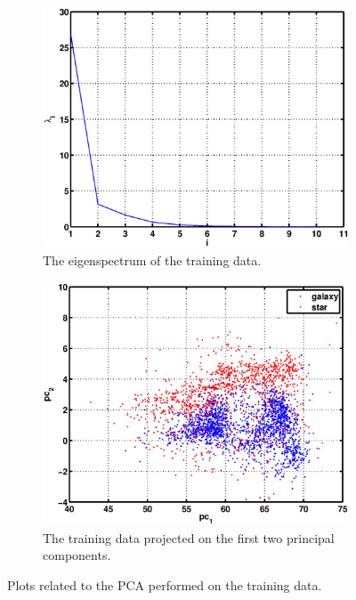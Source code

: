 \documentclass[a4paper, 11pt]{article}
\begin{document}
\begin{figure}[H]
    \centering
    \begin{subfigure}[t]{0.48\textwidth}
    \includegraphics[width=\textwidth]{figures/question4_1}
        \caption{The eigenspectrum of the training data.}\label{fig:question4_1}
    \end{subfigure}
    \hspace{0.5em}
    \begin{subfigure}[t]{0.48\textwidth}
        \includegraphics[width=\textwidth]{figures/question4_2}
        \caption{The training data projected on the first two principal components.}\label{fig:question4_2}
    \end{subfigure}
    \caption{Plots related to the PCA performed on the training data.}\label{fig:question4}
\end{figure}
\end{document}
